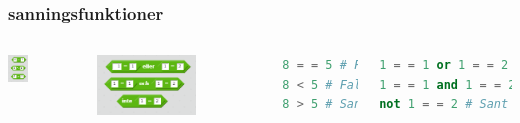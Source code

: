 \documentclass{beamer}
\begin{document}
\begin{frame}[fragile]
	\frametitle{sanningsfunktioner}
	
	\begin{columns}[c] %
		\begin{center}
			\includegraphics[width=0.3\textwidth]{blocks/boolean.png}
		\end{center}
		\begin{center}
			\includegraphics[width=0.6\textwidth]{blocks/boolean_2.png}
		\end{center}
		\begin{lstlisting}[language=Python]
8 = = 5 # Falskt
8 < 5 # Falskt
8 > 5 # Sant
		\end{lstlisting}
		\begin{lstlisting}[language=Python]
1 = = 1 or 1 = = 2 # Sant
1 = = 1 and 1 = = 2 # Falskt
not 1 = = 2 # Sant
		\end{lstlisting}
	\end{columns}
\end{frame}
\end{document}
